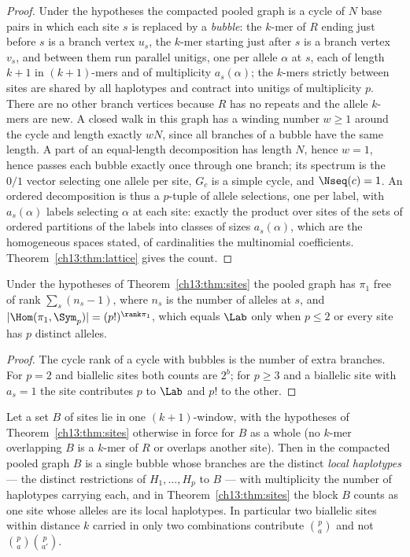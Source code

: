 \begin{proof}
Under the hypotheses the compacted pooled graph is a cycle of $N$ base pairs in which each
site $s$ is replaced by a \emph{bubble}: the $k$-mer of $R$ ending just before $s$ is a branch
vertex $u_s$, the $k$-mer starting just after $s$ is a branch vertex $v_s$, and between them
run parallel unitigs, one per allele $\alpha$ at $s$, each of length $k{+}1$ in
$(k{+}1)$-mers and of multiplicity $a_s(\alpha)$; the $k$-mers strictly between sites are
shared by all haplotypes and contract into unitigs of multiplicity $p$. There are no other
branch vertices because $R$ has no repeats and the allele $k$-mers are new. A closed walk in
this graph has a winding number $w\ge1$ around the cycle and length exactly $wN$, since all
branches of a bubble have the same length. A part of an equal-length decomposition has length
$N$, hence $w=1$, hence passes each bubble exactly once through one branch; its spectrum is
the $0/1$ vector selecting one allele per site, $G_c$ is a simple cycle, and $\Nseq(c)=1$.
An ordered decomposition is thus a $p$-tuple of allele selections, one per label, with
$a_s(\alpha)$ labels selecting $\alpha$ at each site: exactly the product over sites of the
sets of ordered partitions of the labels into classes of sizes $a_s(\alpha)$, which are the
homogeneous spaces stated, of cardinalities the multinomial coefficients. Theorem~\ref{ch13:thm:lattice}
gives the count.
\end{proof}

\begin{corollary}\label{ch13:cor:notH1}
Under the hypotheses of Theorem~\ref{ch13:thm:sites} the pooled graph has $\pi_1$ free of rank
$\sum_s(n_s-1)$, where $n_s$ is the number of alleles at $s$, and
$|\Hom(\pi_1,\Sym_p)|=(p!)^{\rank\pi_1}$, which equals $\Lab$ only when $p\le2$ or every
site has $p$ distinct alleles.
\end{corollary}

\begin{proof}
The cycle rank of a cycle with bubbles is the number of extra branches. For $p=2$ and biallelic
sites both counts are $2^b$; for $p\ge3$ and a biallelic site with $a_s=1$ the site
contributes $p$ to $\Lab$ and $p!$ to the other.
\end{proof}

\begin{theorem}[Linkage]\label{ch13:thm:linkage}
Let a set $B$ of sites lie in one $(k{+}1)$-window, with the hypotheses of
Theorem~\ref{ch13:thm:sites} otherwise in force for $B$ as a whole (no $k$-mer overlapping $B$ is a
$k$-mer of $R$ or overlaps another site). Then in the compacted pooled graph $B$ is a single
bubble whose branches are the distinct \emph{local haplotypes} --- the distinct restrictions
of $H_1,\dots,H_p$ to $B$ --- with multiplicity the number of haplotypes carrying each, and in
Theorem~\ref{ch13:thm:sites} the block $B$ counts as one site whose alleles are its local haplotypes.
In particular two biallelic sites within distance $k$ carried in only two combinations
contribute $\binom{p}{a}$ and not $\binom{p}{a}\binom{p}{a'}$.
\end{theorem}

